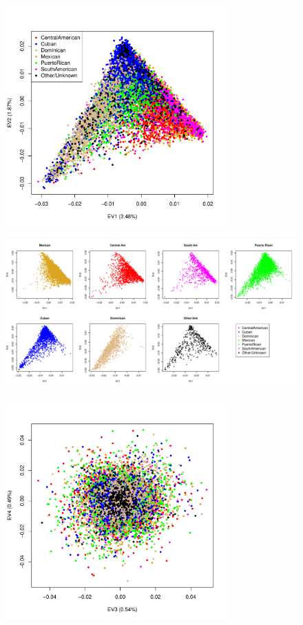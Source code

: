 \documentclass{beamer}
\begin{document}
\begin{frame}
\centering
\begin{figure}
\includegraphics[height=8.5cm]{../pca_x_ev12_col.pdf}
\end{figure}
\end{frame}

\begin{frame}
\centering
\begin{figure}
\includegraphics[width=11.5cm]{../pca_x_ev12_eachCol.pdf}
\end{figure}
\end{frame}

\begin{frame}
\centering
\begin{figure}
\includegraphics[height=8.5cm]{../pca_x_ev34_col.pdf}
\end{figure}
\end{frame}
\end{document}
